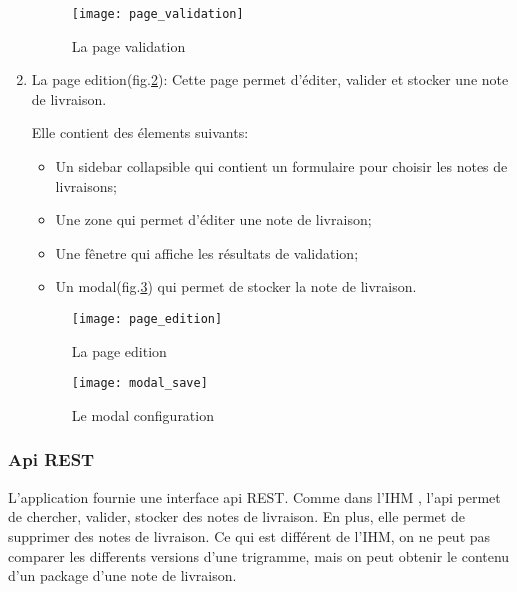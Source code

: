 \begin{enumerate}
       \begin{figure}[ht]
        \centering
        \texttt{[image: page\_validation]}
        \caption{La page validation}
        \label{fig:page_validation}
       \end{figure}

 \item La page edition(fig.\ref{fig:page_edition}):
       Cette page permet d'éditer, valider et stocker une note de livraison.

       Elle contient des élements suivants:
       \begin{itemize}
        \item Un sidebar collapsible qui contient un formulaire pour choisir les notes de livraisons;
        \item Une zone qui permet d'éditer une note de livraison;
        \item Une fênetre qui affiche les résultats de validation;
        \item Un modal(fig.\ref{fig:modal_save}) qui permet de stocker la note de livraison.
       \end{itemize}

       \begin{figure}[ht]
        \centering
        \texttt{[image: page\_edition]}
        \caption{La page edition}
        \label{fig:page_edition}
       \end{figure}

       \begin{figure}[ht]
        \centering
        \texttt{[image: modal\_save]}
        \caption{Le modal configuration}
        \label{fig:modal_save}
       \end{figure}

\end{enumerate}

\clearpage

\subsubsection{Api REST}
L'application fournie une interface api REST.
Comme dans l'IHM , l'api permet de chercher, valider, stocker des notes de livraison.
En plus, elle permet de supprimer des notes de livraison.
Ce qui est différent de l'IHM, on ne peut pas comparer les differents versions d'une trigramme, mais on peut obtenir le contenu d'un package d'une note de livraison.

